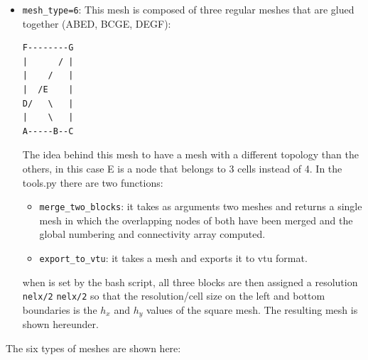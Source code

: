 \begin{itemize}
\item \lstinline{mesh_type=6}: This mesh is composed of three
regular meshes that are glued together (ABED, BCGE, DEGF):
\begin{verbatim}
F--------G
|      / |
|    /   |
|  /E    |
D/   \   |
|    \   |
A-----B--C
\end{verbatim}
The idea behind this mesh to have a mesh with a different topology than the others, 
in this case E is a node that belongs to 3 cells instead of 4.
In the {\pythonfile tools.py} there are two functions:
\begin{itemize}
\item \verb'merge_two_blocks': it takes as arguments two meshes and returns a single mesh in which 
the overlapping nodes of both have been merged and the global numbering and connectivity array computed.
\item \verb'export_to_vtu': it takes a mesh and exports it to vtu format.
\end{itemize}
when  is set by the bash script, all three blocks are then assigned a 
resolution \lstinline{nelx/2} \times \lstinline{nelx/2} so that the resolution/cell size
on the left and bottom boundaries is the $h_x$ and $h_y$ values of the square mesh. 
The resulting mesh is shown hereunder. 
\end{itemize}

The six types of meshes are shown here:


